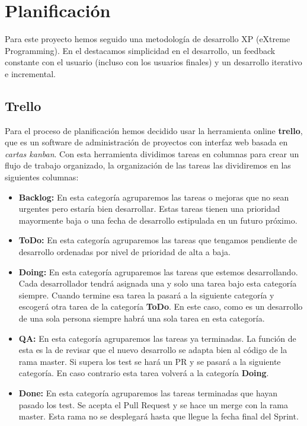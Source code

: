 \setcounter{chapter}{2}
\setcounter{section}{0}
\setcounter{subsection}{0}
\chapter{Planificación}

Para este proyecto hemos seguido una metodología de desarrollo XP (eXtreme Programming). En el destacamos simplicidad en el desarrollo, un feedback constante con el usuario (incluso con los usuarios finales) y un desarrollo iterativo e incremental.\\

\section{Trello}

Para el proceso de planificación hemos decidido usar la herramienta online \textbf{trello}, que es un software de administración de proyectos con interfaz web basada en \textit{cartas kanban}. Con esta herramienta dividimos tareas en columnas para crear un flujo de trabajo organizado, la organización de las tareas las dividiremos en las siguientes columnas:

\begin{itemize}
	\item \textbf{Backlog:} En esta categoría agruparemos las tareas o mejoras que no sean urgentes pero estaría bien desarrollar. Estas tareas tienen una prioridad mayormente baja o una fecha de desarrollo estipulada en un futuro próximo.
	\item \textbf{ToDo:} En esta categoría agruparemos las tareas que tengamos pendiente de desarrollo ordenadas por nivel de prioridad de alta a baja.
	\item \textbf{Doing:} En esta categoría agruparemos las tareas que estemos desarrollando. Cada desarrollador tendrá asignada una y solo una tarea bajo esta categoría siempre. Cuando termine esa tarea la pasará a la siguiente categoría y escogerá otra tarea de la categoría \textbf{ToDo}. En este caso, como es un desarrollo de una sola persona siempre habrá una sola tarea en esta categoría.
	\item \textbf{QA:} En esta categoría agruparemos las tareas ya terminadas. La función de esta es la de revisar que el nuevo desarrollo se adapta bien al código de la rama master. Si supera los test se hará un PR y se pasará a la siguiente categoría. En caso contrario esta tarea volverá a la categoría \textbf{Doing}.
	\item \textbf{Done: } En esta categoría agruparemos las tareas terminadas que hayan pasado los test. Se acepta el Pull Request y se hace un merge con la rama master. Esta rama no se desplegará hasta que llegue la fecha final del Sprint.
\end{itemize}

